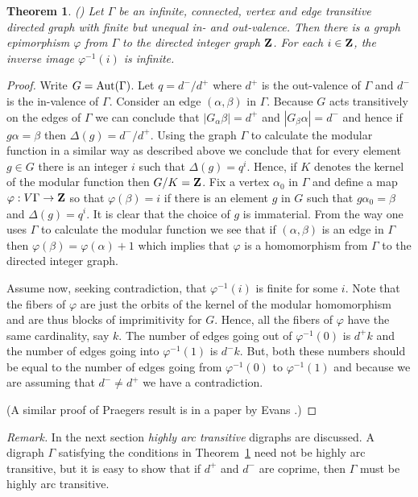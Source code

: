 \documentclass{emsprocart}
\newtheorem{theorem}{Theorem}[section]
\theoremstyle{definition}
\begin{document}
\begin{theorem} {\rm (\cite{Praeger1991})} \label{Tepimorphism}
Let $\Gamma$ be an infinite, connected, vertex and edge transitive directed
graph with finite but unequal in- and out-valence.  Then there is a
graph epimorphism $\varphi$ from $\Gamma$ to the directed integer graph
${\mbox{\bf Z}}$.  For each $i\in {\mbox{\bf Z}}$, the inverse image $\varphi^{-1}(i)$ is
infinite.
\end{theorem}

\begin{proof}  Write $G={\mbox{${\rm Aut}(\Gamma)$}}$.  Let $q=d^-/d^+$ where $d^+$ is the
out-valence of $\Gamma$ and $d^-$ is the in-valence of $\Gamma$.
Consider an edge $(\alpha,\beta)$ in $\Gamma$.  Because $G$ acts
transitively on the edges of $\Gamma$ we can conclude that
$|G_\alpha \beta|=d^+$
and $|G_\beta \alpha|=d^-$ and hence if $g\alpha=\beta$
then $\Delta(g)=d^-/d^+$.  Using the graph $\Gamma$ to calculate the
modular function in a similar way as described above we
conclude that for every element $g\in G$ there is an integer $i$ such
that $\Delta(g)=q^i$.  Hence, if $K$ denotes the kernel of the modular
function then $G/K={\mbox{\bf Z}}$.  Fix a vertex $\alpha_0$ in $\Gamma$ and define a map
$\varphi:V\Gamma\rightarrow {\mbox{\bf Z}}$ so that $\varphi(\beta)=i$ if there is an
element $g$ in $G$ such that $g\alpha_0=\beta$ and $\Delta(g)=q^i$.
It is clear that the choice of $g$ is immaterial.  From the way
one uses $\Gamma$ to calculate the modular function  we see that if
$(\alpha,\beta)$ is
an edge in $\Gamma$ then $\varphi(\beta)=\varphi(\alpha)+1$ which implies that
$\varphi$ is a homomorphism from $\Gamma$ to the directed integer
graph.

Assume now, seeking contradiction, that $\varphi^{-1}(i)$ is finite for some $i$.
Note that the fibers of $\varphi$ are just the orbits of the kernel of
the modular homomorphism and are thus  blocks of imprimitivity for
$G$.  Hence, all the fibers of $\varphi$ have the same cardinality,
say $k$.    The number of edges going out of $\varphi^{-1}(0)$ is 
$d^+k$ and the number of edges going into $\varphi^{-1}(1)$ is
$d^-k$.  But, both these numbers should be equal to the number of
edges going from $\varphi^{-1}(0)$ to $\varphi^{-1}(1)$ and because we
are assuming that $d^-\neq d^+$ we have a contradiction.

(A similar proof of Praegers result is in a paper by Evans
\cite{Evans1997}.)\end{proof}

\bigskip
{\em Remark.}  In the next section {\em highly arc transitive}
  digraphs are discussed.  A digraph $\Gamma$ satisfying the conditions
  in Theorem~\ref{Tepimorphism}
  need not be highly arc transitive, but it is easy to show that if
  $d^+$ and $d^-$ are coprime, then $\Gamma$ must be highly arc
  transitive.
\end{document}

